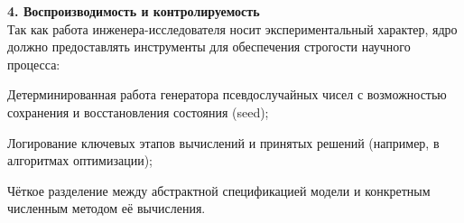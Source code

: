 \textbf{4. Воспроизводимость и контролируемость} \\
Так как работа инженера-исследователя носит экспериментальный характер, ядро должно предоставлять инструменты для обеспечения строгости научного процесса:
\begin{itemizecmp}
    \item Детерминированная работа генератора псевдослучайных чисел с возможностью сохранения и восстановления состояния (seed);
    \item Логирование ключевых этапов вычислений и принятых решений (например, в алгоритмах оптимизации);
    \item Чёткое разделение между абстрактной спецификацией модели и конкретным численным методом её вычисления.
\end{itemizecmp}